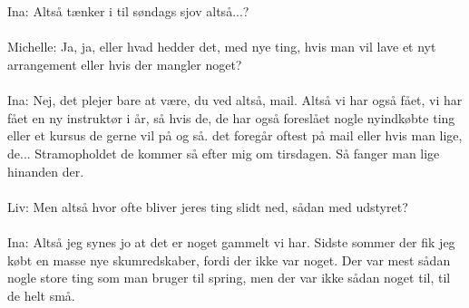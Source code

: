 \\\\
Ina: Altså tænker i til søndags sjov altså...?
\\\\
Michelle: Ja, ja, eller hvad hedder det, med nye ting, hvis man vil lave et nyt arrangement eller hvis der mangler noget?
\\\\
Ina: Nej, det plejer bare at være, du ved altså, mail. Altså vi har også fået, vi har fået en ny instruktør i år, så hvis de, de har også foreslået nogle nyindkøbte ting eller et kursus de gerne vil på og så. det foregår oftest på mail eller hvis man lige, de... Stramopholdet de kommer så efter mig om tirsdagen. Så fanger man lige hinanden der. 
\\\\
Liv: Men altså hvor ofte bliver jeres ting slidt ned, sådan med udstyret?
\\\\
Ina: Altså jeg synes jo at det er noget gammelt vi har. Sidste sommer der fik jeg købt en masse nye skumredskaber, fordi der ikke var noget. Der var mest sådan nogle store ting som man bruger til spring, men der var ikke sådan noget til, til de helt små. 





